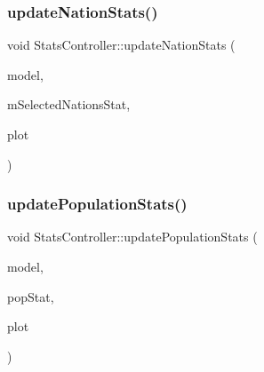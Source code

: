 \subsubsection{\texorpdfstring{updateNationStats()}{updateNationStats()}}
{\footnotesize\ttfamily void Stats\+Controller\+::update\+Nation\+Stats (\begin{DoxyParamCaption}\item[{\mbox{\hyperlink{class_displace_model}{Displace\+Model}} $\ast$}]{model,  }\item[{\mbox{\hyperlink{namespacedisplace_1_1plot_ab7b96ae3ae291a71823f371d77f27d98}{displace\+::plot\+::\+Nations\+Stat}}}]{m\+Selected\+Nations\+Stat,  }\item[{\mbox{\hyperlink{class_q_custom_plot}{Q\+Custom\+Plot}} $\ast$}]{plot }\end{DoxyParamCaption})\hspace{0.3cm}{\ttfamily [protected]}}

\mbox{\label{class_stats_controller_a9d511629c1e94339c39d23fe4d24746a}} 
\subsubsection{\texorpdfstring{updatePopulationStats()}{updatePopulationStats()}}
{\footnotesize\ttfamily void Stats\+Controller\+::update\+Population\+Stats (\begin{DoxyParamCaption}\item[{\mbox{\hyperlink{class_displace_model}{Displace\+Model}} $\ast$}]{model,  }\item[{\mbox{\hyperlink{namespacedisplace_1_1plot_a523612c6239ff69acc3e5b7c5b40b618}{displace\+::plot\+::\+Population\+Stat}}}]{pop\+Stat,  }\item[{\mbox{\hyperlink{class_q_custom_plot}{Q\+Custom\+Plot}} $\ast$}]{plot }\end{DoxyParamCaption})\hspace{0.3cm}{\ttfamily [protected]}}

\mbox{\label{class_stats_controller_a47180a6975ace43dd1a3f0df275f1842}} 
